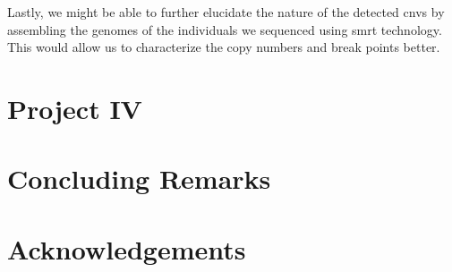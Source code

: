 \documentclass[draft]{scrbook}
\begin{document}
Lastly, we might be able to further elucidate the nature of the detected \glspl{cnv} by assembling the genomes of the individuals we sequenced using \gls{smrt} technology.
This would allow us to characterize the copy numbers and break points better.

\chapter{Project IV}
\chapter{Concluding Remarks}


\backmatter

\chapter{Acknowledgements}

\printglossary[type=\acronymtype]

\printglossary

\printbibliography
\end{document}
